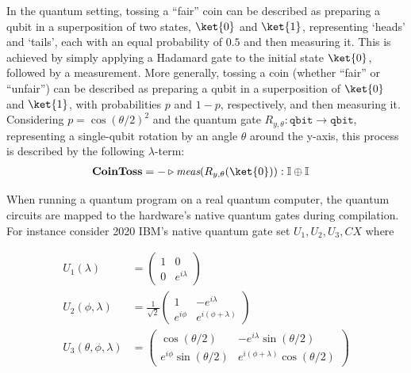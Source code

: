 \begin{example} 
  In the quantum setting, tossing a ``fair'' coin can be described as preparing a qubit in a superposition of two states, $\ket{0}$ and $\ket{1}$, representing `heads' and `tails', each with an equal probability of $0.5$ and then measuring it. This is achieved by simply applying a Hadamard gate to the initial state $\ket{0}$, followed by a measurement.
More generally, tossing a coin (whether ``fair'' or ``unfair'') can be described as preparing a qubit in a superposition of  $\ket{0}$ and $\ket{1}$, with probabilities $p$ and $1-p$, respectively,  and then measuring it.  Considering $p= \cos(\theta/2)^2$ and the quantum gate $R_{y,\theta} : \mathtt{qbit} \to \mathtt{qbit}$, representing a single-qubit rotation by an angle \( \theta \) around the y-axis,  this process is described by the following $\lambda$-term:
\begin{align*}
  &\textbf{CoinToss} = - \vljud \emph{meas} (R_{y,\theta} (\ket{0})): \typeI \oplus \typeI
\end{align*}

When running a quantum program on a real quantum computer, the quantum circuits are mapped to the hardware's native quantum gates during compilation. For instance consider 2020 IBM's native quantum gate set $U_1,U_2,U_3,CX$ where

  \begin{align*}
    U_1(\lambda) &= 
    \begin{pmatrix}
        1 & 0 \\
        0 & e^{i\lambda}
    \end{pmatrix} \\
    U_2(\phi, \lambda) &= 
    \frac{1}{\sqrt{2}}
    \begin{pmatrix}
        1 & -e^{i\lambda} \\
        e^{i\phi} & e^{i(\phi+\lambda)}
    \end{pmatrix} \\
    U_3(\theta, \phi, \lambda) &= 
    \begin{pmatrix}
        \cos(\theta/2) & -e^{i\lambda}\sin(\theta/2) \\
        e^{i\phi}\sin(\theta/2) & e^{i(\phi+\lambda)}\cos(\theta/2)
    \end{pmatrix} \\
\end{align*}


\end{example}
